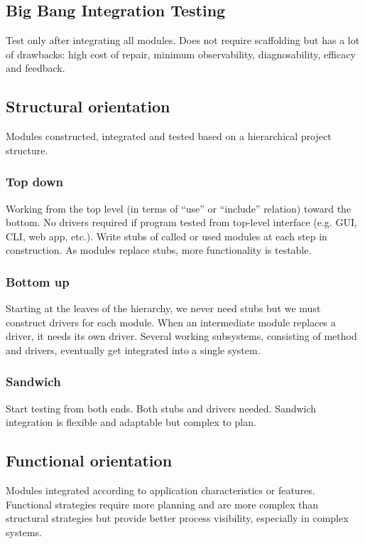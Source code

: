 \documentclass{article}
\begin{document}
\subsection{Big Bang Integration Testing}
Test only after integrating all modules. Does not require scaffolding  but has a lot of drawbacks: high cost of repair, minimum observability, diagnosability, efficacy and feedback.

\subsection{Structural orientation}
Modules constructed, integrated and tested based on a hierarchical project structure.

\subsubsection{Top down}
Working from the top level (in terms of “use” or “include” relation) toward the bottom. No drivers required if program tested from top-level interface (e.g. GUI, CLI, web app, etc.). Write stubs of called or used modules at each step in construction. As modules replace stubs, more functionality is testable.

\subsubsection{Bottom up}
Starting at the leaves of the hierarchy, we never need stubs but we must construct drivers for each module. When an intermediate module replaces a driver, it needs its own driver. Several working subsystems, consisting of method and drivers, eventually get integrated into a single system.

\subsubsection{Sandwich}
Start testing from both ends. Both stubs and drivers needed. Sandwich integration is flexible and adaptable but complex to plan.

\subsection{Functional orientation}
Modules integrated according to application characteristics or features. Functional strategies require more planning and are more complex than structural strategies but provide better process visibility, especially in complex systems.
\end{document}
